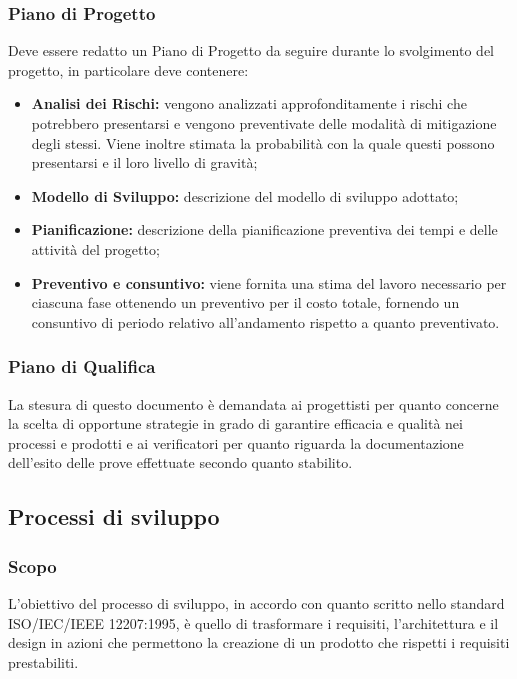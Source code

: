 \subsubsection{Piano di Progetto}
Deve essere redatto un Piano di Progetto da seguire durante lo svolgimento del progetto, in particolare deve contenere:

\begin{itemize}
  \item \textbf{Analisi dei Rischi:} vengono analizzati approfonditamente i rischi che potrebbero presentarsi e vengono preventivate delle modalità di mitigazione degli stessi. Viene inoltre stimata la probabilità con la quale questi possono presentarsi e il loro livello di gravità;
  \item \textbf{Modello di Sviluppo:} descrizione del modello di sviluppo adottato;
  \item \textbf{Pianificazione:} descrizione della pianificazione preventiva dei tempi e delle attività del progetto;
  \item \textbf{Preventivo e consuntivo:}  viene fornita una stima del lavoro necessario per ciascuna fase ottenendo un preventivo per il costo totale,  fornendo un consuntivo di periodo relativo all'andamento rispetto a quanto preventivato.
\end{itemize}

\subsubsection{Piano di Qualifica}
La stesura di questo documento è demandata ai progettisti per quanto concerne la scelta di opportune strategie in grado di garantire efficacia e qualità nei processi e prodotti e ai verificatori per quanto riguarda la documentazione dell'esito delle prove effettuate secondo quanto stabilito.


\subsection{Processi di sviluppo}
\label{_processiDiSviluppo}
\subsubsection{Scopo}

L'obiettivo del processo di sviluppo, in accordo con quanto scritto nello standard ISO/IEC/IEEE 12207:1995, è quello di trasformare i requisiti, l'architettura e il design in azioni che permettono la creazione di un prodotto che rispetti i requisiti prestabiliti.


